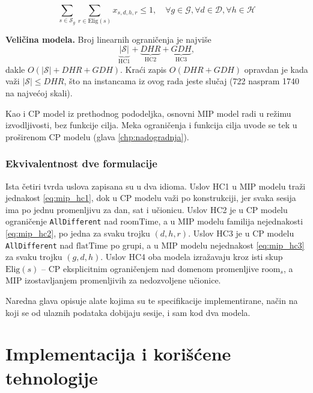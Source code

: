 \documentclass[12pt,oneside]{memoir}
\begin{document}
\begin{equation}
\sum_{s \in \mathcal{S}_g} \sum_{r \in \text{Elig}(s)} x_{s,d,h,r}
  \leq 1, \quad \forall g \in \mathcal{G},
  \forall d \in \mathcal{D}, \forall h \in \mathcal{H}
\label{eq:mip_hc3}
\end{equation}

\medskip
\textbf{Veličina modela.} Broj linearnih ograničenja je najviše
\begin{equation}
\underbrace{|\mathcal{S}|}_{\text{HC1}} +
\underbrace{D H R}_{\text{HC2}} +
\underbrace{G D H}_{\text{HC3}},
\label{eq:mip_broj_ogranicenja}
\end{equation}
dakle $O(|\mathcal{S}| + DHR + GDH)$. Kraći zapis $O(DHR + GDH)$
opravdan je kada važi $|\mathcal{S}| \leq DHR$, što na instancama iz
ovog rada jeste slučaj (722 naspram 1740 na najvećoj skali).

Kao i CP model iz prethodnog pododeljka, osnovni MIP model radi u
režimu izvodljivosti, bez funkcije cilja. Meka ograničenja i funkcija
cilja uvode se tek u proširenom CP modelu (glava
\ref{chp:nadogradnja}).

\subsection{Ekvivalentnost dve formulacije}
\label{sec:ekvivalentnost}

Ista četiri tvrda uslova zapisana su u dva idioma. Uslov HC1 u MIP
modelu traži jednakost \eqref{eq:mip_hc1}, dok u CP modelu važi po
konstrukciji, jer svaka sesija ima po jednu promenljivu za dan, sat i
učionicu. Uslov HC2 je u CP modelu ograničenje \texttt{AllDifferent}
nad $\text{roomTime}$, a u MIP modelu familija nejednakosti
\eqref{eq:mip_hc2}, po jedna za svaku trojku $(d,h,r)$. Uslov HC3 je
u CP modelu \texttt{AllDifferent} nad $\text{flatTime}$ po grupi, a u
MIP modelu nejednakost \eqref{eq:mip_hc3} za svaku trojku $(g,d,h)$.
Uslov HC4 oba modela izražavaju kroz isti skup $\text{Elig}(s)$ --
CP eksplicitnim ograničenjem nad domenom promenljive
$\text{room}_s$, a MIP izostavljanjem promenljivih za nedozvoljene
učionice.

Naredna glava opisuje alate kojima su te specifikacije implementirane, način
na koji se od ulaznih podataka dobijaju sesije, i sam kod dva modela.


\chapter{Implementacija i korišćene tehnologije}
\label{chp:implementacija}
\end{document}
